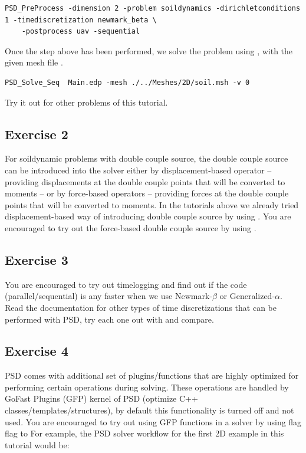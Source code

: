 {{\begin{lstlisting}[style=BashInputStyle]
	PSD_PreProcess -dimension 2 -problem soildynamics -dirichletconditions 1 -timediscretization newmark_beta \
	-postprocess uav -sequential
\end{lstlisting}

Once the step above has been performed, we solve the problem using , with the given mesh file . 

\begin{lstlisting}[style=BashInputStyle]
	PSD_Solve_Seq  Main.edp -mesh ./../Meshes/2D/soil.msh -v 0
\end{lstlisting}

Try it out for other problems of this tutorial. 

\subsection{Exercise 2}

For soildynamic problems with double couple source, the double couple source can be introduced into the solver either by displacement-based operator -- providing displacements at the double couple points that will be converted to moments -- or by force-based operators -- providing forces at the double couple points that  will be converted to moments. In the tutorials above we already tried displacement-based way of introducing double couple source by using . You are encouraged to try out the force-based double couple source by using .

\subsection{Exercise 3}

You are encouraged to try out timelogging and find out if the code (parallel/sequential) is any faster when we use Newmark-$\beta$ or Generalized-$\alpha$. Read the documentation for other types of time discretizations that can be performed with PSD, try each one out with  and compare.

\subsection{Exercise  4}

PSD comes with additional set of plugins/functions that are highly optimized for performing certain operations during solving. These operations are handled by GoFast Plugins (GFP) kernel of PSD (optimize C++ classes/templates/structures), by default this functionality is turned off and not used. You are encouraged to try out using GFP functions in a solver by using  flag flag to  For example, the PSD solver workflow for the first 2D example in this tutorial would be:

}}
